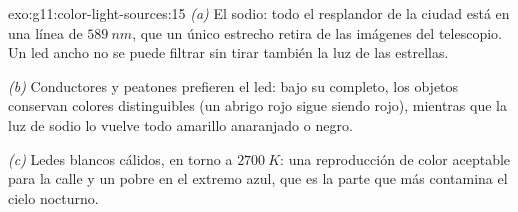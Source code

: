 \begin{solution}{exo:g11:color-light-sources:15}
\emph{(a)} El sodio: todo el resplandor de la ciudad está en una línea
de $\qty{589}{nm}$, que un único  estrecho retira de las imágenes
del telescopio. Un  led ancho no se puede filtrar sin tirar
también la luz de las estrellas.

\emph{(b)} Conductores y peatones prefieren el led: bajo su 
completo, los objetos conservan colores distinguibles (un abrigo rojo
sigue siendo rojo), mientras que la luz de sodio lo vuelve todo amarillo
anaranjado o negro.

\emph{(c)} Ledes blancos cálidos, en torno a $\qty{2700}{K}$: una
reproducción de color aceptable para la calle y un  pobre en el
extremo azul, que es la parte que más contamina el cielo nocturno.
\end{solution}


